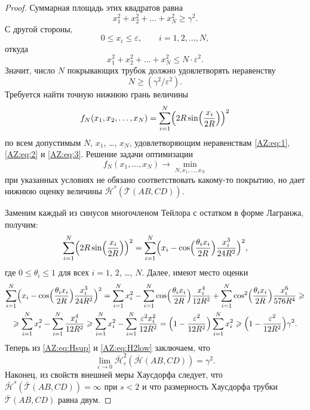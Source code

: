 \documentclass[12pt]{article}
\begin{document}
\begin{proof}
  Суммарная площадь этих квадратов равна
  \begin{equation}
    x_1^2+x_2^2+\ldots+x_N^2\geqslant \gamma^2.\label{AZ:eq:1}
  \end{equation}
  С другой стороны,
  \begin{equation}
    0\leqslant x_i \leqslant \varepsilon, \qquad i=1,2,\ldots,N,
    \label{AZ:eq:2}
  \end{equation}
  откуда
  $$    x_1^2+x_2^2+\ldots+x_N^2\leqslant N\cdot \varepsilon^2.$$
  Значит, число $N$ покрывающих трубок должно удовлетворять неравенству
  \begin{equation}
    N\geqslant(\gamma^2/\varepsilon^2).
    \label{AZ:eq:3}
  \end{equation}
  Требуется найти точную нижнюю грань величины
  $$
  f_N(x_1, x_2, \ldots, x_N)=\sum_{i=1}^N \Bigl(
     2R \sin\Bigl(\frac{x_i}{2R}\Bigr)
  \Bigr)^2
  $$
  по всем допустимым $N$, $x_1$, \ldots, $x_N$, удовлетворяющим неравенствам
  \eqref{AZ:eq:1}, \eqref{AZ:eq:2} и \eqref{AZ:eq:3}. Решение задачи
  оптимизации $$f_N(x_1, \ldots, x_N)\to\min_{N,x_1,\ldots,x_N}$$ при указанных
  условиях не обязано соответствовать какому-то покрытию, но дает нижнюю оценку
  величины $\bar{\mathcal H}^s(\bar{\mathcal T}(AB,CD))$.
  
  Заменим каждый из синусов многочленом Тейлора с остатком в форме Лагранжа,
  получим:
  $$
  \sum_{i=1}^N \Bigl(2R \sin\Bigl(\frac{x_i}{2R}\Bigr)\Bigr)^2=
  \sum_{i=1}^N\Bigl(x_i-\cos\Bigl(\frac{ \theta_i x_i}{2R} \Bigr)
  \frac{x_i^3}{24R^2}
  \Bigr)^2,
  $$
  где $0\leqslant  \theta_i \leqslant 1$ для всех $i=1$, $2$, \ldots, $N$.
  Далее, имеют место оценки
  \begin{multline}
    \sum_{i=1}^N\Bigl(x_i-\cos\Bigl(\frac{ \theta_i x_i}{2R} \Bigr)
    \frac{x_i^3}{24R^2} \Bigr)^2=  \sum_{i=1}^N x_i^2 -\sum_{i=1}^N
    \cos\Bigl(\frac{ \theta_i x_i}{2R} \Bigr) \frac{x_i^4}{12R^2}+
    \sum_{i=1}^N \cos^2\Bigl(\frac{ \theta_i x_i}{2R} \Bigr)
    \frac{x_i^6}{576R^4}\geqslant
    \\ \geqslant \sum_{i=1}^N x_i^2
    -\sum_{i=1}^N \frac{x_i^4}{12R^2} \geqslant \sum_{i=1}^N x_i^2
    -\sum_{i=1}^N \frac{\varepsilon^2x_i^2}{12R^2} =
    \Bigl(1-\frac{\varepsilon^2}{12R^2}\Bigr)\sum_{i=1}^N x_i^2 \geqslant
    \Bigl(1-\frac{\varepsilon^2}{12R^2}\Bigr) \gamma^2.
    \label{AZ:eq:H2low}
  \end{multline}
  Теперь из \eqref{AZ:eq:Hsup} и
  \eqref{AZ:eq:H2low} заключаем, что
  $$
  \lim_{\varepsilon\to0} \bar{\mathcal H}^2_\varepsilon( \bar{\mathcal
    H}(AB,CD))=\gamma^2.
  $$
  Наконец, из свойств внешней меры Хаусдорфа следует, что
  $\bar{\mathcal H}^s( \bar{\mathcal T}(AB,CD))=\infty$ при $s<2$
  и что размерность Хаусдорфа трубки $\bar{\mathcal T}(AB,CD)$ равна двум.
\end{proof}
\end{document}
